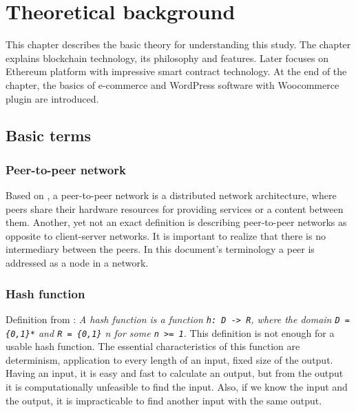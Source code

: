 \documentclass[thesis=M,english]{FITthesis}[2019/12/23]
\begin{document}




\chapter{Theoretical background}

This chapter describes the basic theory for understanding this study. The chapter explains blockchain technology, its philosophy and features. Later focuses on Ethereum platform with impressive smart contract technology. At the end of the chapter, the basics of e-commerce and WordPress software with Woocommerce plugin are introduced.

\section{Basic terms} 
\subsection{Peer-to-peer network}
Based on \cite{Schollmeier2002}, a peer-to-peer network is a distributed network architecture, where peers share their hardware resources for providing services or a content between them.
Another, yet not an exact definition is describing peer-to-peer networks as opposite to client-server networks. It is important to realize that there is no intermediary between the peers.
In this document's terminology a peer is addressed as a node in a network.


\subsection{Hash function}

Definition from \cite{CryptographicHash}: \textit{A hash function is a function \texttt{h: D -> R}, where the domain \texttt{D = \{0,1\}*} and \texttt{R = \{0,1\}} n for some \texttt{n >= 1}.}
This definition is not enough for a usable hash function. The essential characteristics of this function are determinism, application to every length of an input, fixed size of the output. Having an input, it is easy and fast to calculate an output, but from the output it is computationally unfeasible to find the input. Also, if we know the input and the output, it is impracticable to find another input with the same output.
\end{document}
